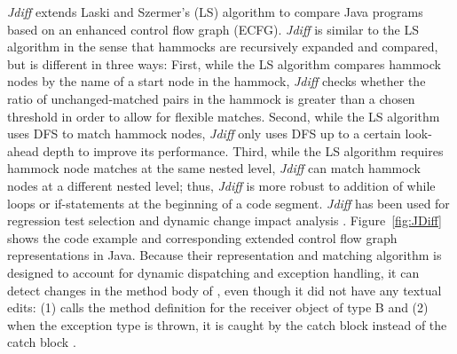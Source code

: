 \textit{Jdiff} \cite{Apiwattanapong2004} extends Laski and Szermer's (LS) algorithm to compare Java programs based on an enhanced control flow graph (ECFG). \textit{Jdiff} is similar to the LS algorithm in the sense that hammocks are recursively expanded and compared, but is different in three ways: First, while the LS algorithm compares hammock nodes by the name of a start node in the hammock, \textit{Jdiff} checks whether the ratio of unchanged-matched pairs in the hammock is greater than a chosen threshold in order to allow for flexible matches. Second, while the LS algorithm uses DFS to match hammock nodes, \textit{Jdiff} only uses DFS up to a certain look-ahead depth to improve its performance. Third, while the LS algorithm requires hammock node matches at the same nested level, \textit{Jdiff} can match hammock nodes at a different nested level; thus, \textit{Jdiff} is more robust to addition of while loops or if-statements at the beginning of a code segment. \textit{Jdiff} has been used for regression test selection \cite{Orso2004} and dynamic change impact analysis \cite{Apiwattanapong2005}. Figure~\ref{fig:JDiff} shows the code example and corresponding extended control flow graph representations in Java. Because their representation and matching algorithm is designed to account for dynamic dispatching and exception handling, it can detect changes in the method body of , even though it did not have any textual edits: (1)  calls the method definition  for the receiver object of type B and (2) when the exception type  is thrown, it is caught by the catch block  instead of the catch block .   

